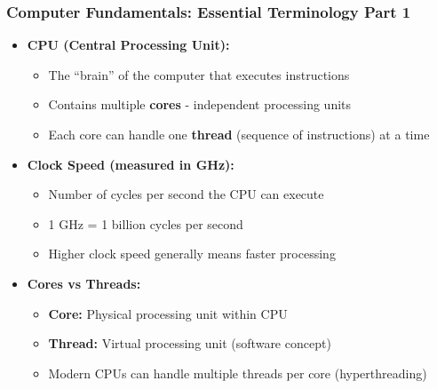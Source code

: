 \begin{frame}
\frametitle{Computer Fundamentals: Essential Terminology Part 1}
\begin{itemize}
    \item \textbf{CPU (Central Processing Unit):}
    \begin{itemize}
        \item The ``brain'' of the computer that executes instructions
        \item Contains multiple \textbf{cores} - independent processing units
        \item Each core can handle one \textbf{thread} (sequence of instructions) at a time
    \end{itemize}
    \item \textbf{Clock Speed (measured in GHz):}
    \begin{itemize}
        \item Number of cycles per second the CPU can execute
        \item 1 GHz = 1 billion cycles per second
        \item Higher clock speed generally means faster processing
    \end{itemize}
    \item \textbf{Cores vs Threads:}
    \begin{itemize}
        \item \textbf{Core:} Physical processing unit within CPU
        \item \textbf{Thread:} Virtual processing unit (software concept)
        \item Modern CPUs can handle multiple threads per core (hyperthreading)
    \end{itemize}
\end{itemize}
\end{frame}

